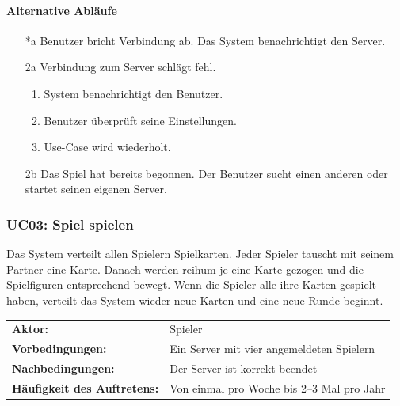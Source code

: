 \documentclass[a4paper,12pt,halfparskip,DIV14]{scrartcl}
\begin{document}
\paragraph{Alternative Abläufe}
\begin{enumerate}
	\item[*a] Benutzer bricht Verbindung ab.\newline
	Das System benachrichtigt den Server.
	\item[2a] Verbindung zum Server schlägt fehl.
	\begin{enumerate}
		\item System benachrichtigt den Benutzer.
		\item Benutzer überprüft seine Einstellungen.
		\item Use-Case wird wiederholt.
	\end{enumerate}
	\item[2b] Das Spiel hat bereits begonnen.\newline
	Der Benutzer sucht einen anderen oder startet seinen eigenen Server.
\end{enumerate}

\subsubsection{UC03: Spiel spielen}\label{ssub:uc03_spiel_erstellen}
Das System verteilt allen Spielern Spielkarten. Jeder Spieler tauscht mit seinem Partner eine Karte. Danach werden reihum je eine Karte gezogen und die Spielfiguren entsprechend bewegt. Wenn die Spieler alle ihre Karten gespielt haben, verteilt das System wieder neue Karten und eine neue Runde beginnt. 

\begin{tabular}{@{} l l @{}}
	\textbf{Aktor:}														&	Spieler \\
	\textbf{Vorbedingungen:}									& Ein Server mit vier angemeldeten Spielern \\
	\textbf{Nachbedingungen:}									& Der Server ist korrekt beendet \\
	\textbf{Häufigkeit des Auftretens:}				& Von einmal pro Woche bis 2--3 Mal pro Jahr \\
\end{tabular}
\newpage
\end{document}
